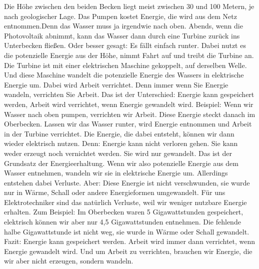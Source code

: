 \begin{frame}
{			Die Höhe zwischen den beiden Becken liegt meist zwischen 30 und 100 Metern, je nach geologischer Lage.
			Das Pumpen kostet Energie, die wird aus dem Netz entnommen.Denn das Wasser muss ja irgendwie nach oben.
			Abends, wenn die Photovoltaik abnimmt, kann das Wasser dann durch eine Turbine zurück ins Unterbecken fließen.
			Oder besser gesagt: Es fällt einfach runter.
			Dabei nutzt es die potenzielle Energie aus der Höhe, nimmt Fahrt auf und treibt die Turbine an.
			Die Turbine ist mit einer elektrischen Maschine gekoppelt, auf derselben Welle.
			Und diese Maschine wandelt die potenzielle Energie des Wassers in elektrische Energie um.
			Dabei wird Arbeit verrichtet.
			Denn immer wenn Sie Energie wandeln, verrichten Sie Arbeit.
			Das ist der Unterschied:
			Energie kann gespeichert werden, Arbeit wird verrichtet, wenn Energie gewandelt wird.
			Beispiel:
			Wenn wir Wasser nach oben pumpen, verrichten wir Arbeit. Diese Energie steckt danach im Oberbecken.
			Lassen wir das Wasser runter, wird Energie entnommen und Arbeit in der Turbine verrichtet.
			Die Energie, die dabei entsteht, können wir dann wieder elektrisch nutzen.
			Denn: Energie kann nicht verloren gehen. Sie kann weder erzeugt noch vernichtet werden.
			Sie wird nur gewandelt. Das ist der Grundsatz der Energieerhaltung.
			Wenn wir also potenzielle Energie aus dem Wasser entnehmen, wandeln wir sie in elektrische Energie um.
			Allerdings entstehen dabei Verluste. 
			Aber: Diese Energie ist nicht verschwunden, sie wurde nur in Wärme, Schall oder andere Energieformen umgewandelt.
			Für uns Elektrotechniker sind das natürlich Verluste, weil wir weniger nutzbare Energie erhalten.
			Zum Beispiel:
			Im Oberbecken waren 5 Gigawattstunden gespeichert, elektrisch können wir aber nur 4,5 Gigawattstunden entnehmen.
			Die fehlende halbe Gigawattstunde ist nicht weg, sie wurde in Wärme oder Schall gewandelt.
			Fazit:
			Energie kann gespeichert werden.
			Arbeit wird immer dann verrichtet, wenn Energie gewandelt wird.
			Und um Arbeit zu verrichten, brauchen wir Energie, die wir aber nicht erzeugen, sondern wandeln.
		}

	\end{frame}

